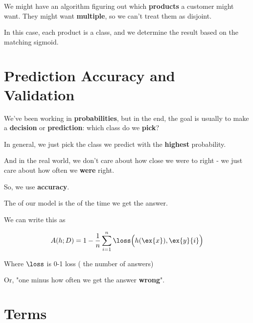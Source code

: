             \miniex We might have an algorithm figuring out which \textbf{products} a customer might want. They might want \textbf{multiple}, so we can't treat them as disjoint.

            In this case, each product is a class, and we determine the result based on the matching sigmoid.

\pagebreak

\section{Prediction Accuracy and Validation}

    We've been working in \textbf{probabilities}, but in the end, the goal is usually to make a \textbf{decision} or \textbf{prediction}: which class do we \textbf{pick}?
    
    In general, we just pick the class we predict with the \textbf{highest} probability.
    
    And in the real world, we don't care about how close we were to right - we just care about how often we \textbf{were} right.
    
    So, we use \textbf{accuracy}.\\
    
    \begin{definition}
        The  of our model is the  of the time we get the  answer.
        
        We can write this as 
        
        \begin{equation}
            A(h;D) = 1 - \frac{1}{n} \sum_{i=1}^n \loss\Big(h(\ex{x}),\ex{y}{i} \Big)
        \end{equation}
        
        Where $\loss$ is 0-1 loss ( the number of  answers)
    \end{definition}
    
    Or, "one minus how often we get the answer \textbf{wrong}".
\pagebreak

\section{Terms}


